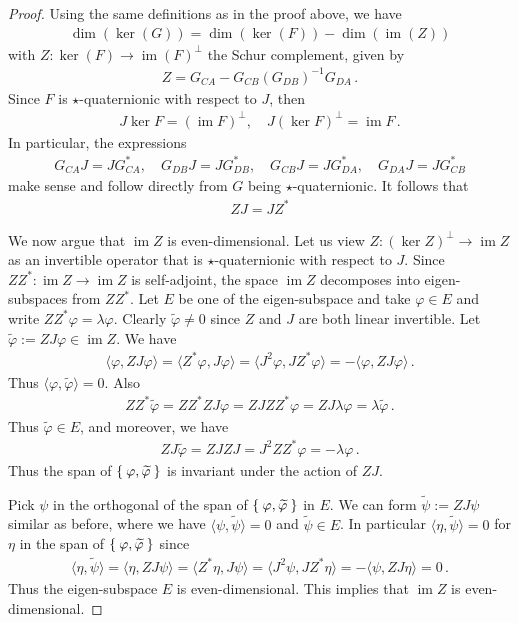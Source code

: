 \documentclass[a4paper,10pt]{article}
\numberwithin{equation}{section}
\theoremstyle{plain}
\theoremstyle{plain}
\theoremstyle{plain}
\theoremstyle{plain}
\theoremstyle{plain}
\theoremstyle{remark}
\theoremstyle{definition}
\theoremstyle{plain}
\newcommand{\ip}[2]{\langle #1, #2 \rangle}
\newcommand{\vf}{\varphi}
\newcommand{\im}{\operatorname{im}}
\newcommand{\eq}[1]{\begin{align*}#1\end{align*}}
\newcommand{\eql}[1]{\begin{align}#1\end{align}}
\newcommand{\Schur}{Z}
\begin{document}
	\begin{proof}
		Using the same definitions as in the proof above, we have 
		\eq{
			\dim\left(\ker\left(G\right)\right)  =  \dim\left(\ker\left(F\right)\right)-\dim\left(\im\left(\Schur\right)\right)
		}
		with $\Schur:\ker\left(F\right)\to\im\left(F\right)^{\perp}$
		the Schur complement, given by 
		\eq{
			\Schur  =  G_{CA}-G_{CB}\left(G_{DB}\right)^{-1}G_{DA}\,.
		}
		Since $F$ is $\star$-quaternionic with respect to $J$, then \eq{J \ker F= (\im F)^\perp,\quad J(\ker F)^\perp = \im F\,.} 
		In particular, the expressions \eq{G_{CA}J=JG_{CA}^*,\quad G_{DB}J=JG_{DB}^*,\quad G_{CB}J=JG_{DA}^*,\quad G_{DA}J=JG_{CB}^*} make sense and follow directly from $G$ being $\star$-quaternionic. It follows that \eq{\Schur J=J \Schur^*}
		
		We now argue that $\im\Schur$ is even-dimensional. Let us view $\Schur:(\ker \Schur)^\perp \to \im \Schur$ as an invertible operator that is $\star$-quaternionic with respect to $J$. Since $\Schur\Schur^*:\im\Schur\to\im\Schur$ is self-adjoint, the space $\im\Schur$ decomposes into eigen-subspaces from $\Schur\Schur^*$. Let $E$ be one of the eigen-subspace and take $\vf\in E$ and write $\Schur\Schur^*\vf=\lambda\vf$. Clearly $\widetilde{\vf}\neq 0$ since $\Schur$ and $J$ are both linear invertible. Let $\widetilde{\vf}:=\Schur J\vf\in\im \Schur$. We have \eq{\ip{\vf}{\Schur J\vf}=\ip{\Schur ^*\vf}{J\vf}=\ip{J^2\vf}{J\Schur^*\vf}=-\ip{\vf}{\Schur J\vf}\,.} 
		Thus $\ip{\vf}{\widetilde{\vf}}=0$. Also \eql{\Schur\Schur^*\widetilde{\vf}=\Schur\Schur^*\Schur J\vf=\Schur J\Schur\Schur^*\vf=\Schur J\lambda\vf=\lambda \widetilde{\vf}\,.} 
		Thus $\widetilde{\vf}\in E$, and moreover, we have \eq{\Schur J\widetilde{\vf}=\Schur J\Schur J=J^2\Schur\Schur^*\vf=-\lambda\vf\,.} 
		Thus the span of $\Set{\vf,\widetilde{\vf}}$ is invariant under the action of $\Schur J$. 
		
		Pick $\psi$ in the orthogonal of the span of $\Set{\vf,\widetilde{\vf}}$ in $E$. We can form $\widetilde{\psi}:=\Schur J \psi$ similar as before, where we have $\ip{\psi}{\widetilde{\psi}}=0$ and $\widetilde{\psi}\in E$. In particular $\ip{\eta}{\widetilde{\psi}}=0$ for $\eta$ in the span of $\Set{\vf,\widetilde{\vf}}$ since \eq{\ip{\eta}{\widetilde{\psi}}=\ip{\eta}{\Schur J\psi}=\ip{\Schur^*\eta}{J\psi}=\ip{J^2\psi}{J\Schur^*\eta}=-\ip{\psi}{\Schur J\eta}=0\,.} 
		Thus the eigen-subspace $E$ is even-dimensional. This implies that $\im \Schur$ is even-dimensional.
		
		
	\end{proof}
	
\end{document}
